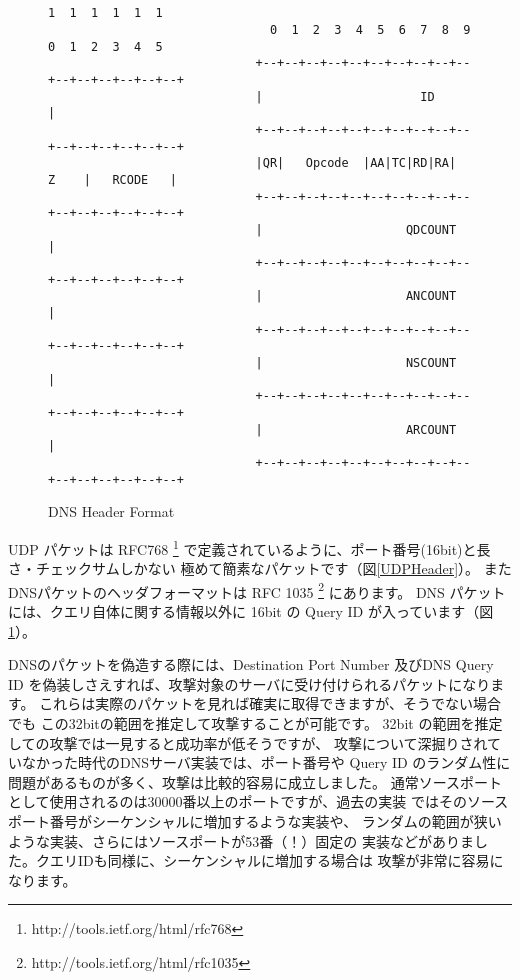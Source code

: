 \begin{figure}[hbt]
{\scriptsize
\begin{verbatim}

                                                             1  1  1  1  1  1
                               0  1  2  3  4  5  6  7  8  9  0  1  2  3  4  5
                             +--+--+--+--+--+--+--+--+--+--+--+--+--+--+--+--+
                             |                      ID                       |
                             +--+--+--+--+--+--+--+--+--+--+--+--+--+--+--+--+
                             |QR|   Opcode  |AA|TC|RD|RA|   Z    |   RCODE   |
                             +--+--+--+--+--+--+--+--+--+--+--+--+--+--+--+--+
                             |                    QDCOUNT                    |
                             +--+--+--+--+--+--+--+--+--+--+--+--+--+--+--+--+
                             |                    ANCOUNT                    |
                             +--+--+--+--+--+--+--+--+--+--+--+--+--+--+--+--+
                             |                    NSCOUNT                    |
                             +--+--+--+--+--+--+--+--+--+--+--+--+--+--+--+--+
                             |                    ARCOUNT                    |
                             +--+--+--+--+--+--+--+--+--+--+--+--+--+--+--+--+
\end{verbatim}
}
\caption{DNS Header Format}
\label{DNSHeader}
\end{figure}


UDP パケットは RFC768 \footnote{http://tools.ietf.org/html/rfc768}
で定義されているように、ポート番号(16bit)と長さ・チェックサムしかない
極めて簡素なパケットです（図\ref{UDPHeader}）。
またDNSパケットのヘッダフォーマットは RFC 1035 \footnote{http://tools.ietf.org/html/rfc1035} 
にあります。
DNS パケットには、クエリ自体に関する情報以外に 16bit の Query ID が入っています（図\ref{DNSHeader}）。

DNSのパケットを偽造する際には、Destination Port Number 及びDNS Query
ID を偽装しさえすれば、攻撃対象のサーバに受け付けられるパケットになります。
これらは実際のパケットを見れば確実に取得できますが、そうでない場合でも
この32bitの範囲を推定して攻撃することが可能です。
32bit の範囲を推定しての攻撃では一見すると成功率が低そうですが、
攻撃について深掘りされていなかった時代のDNSサーバ実装では、ポート番号や
Query ID のランダム性に問題があるものが多く、攻撃は比較的容易に成立しました。
通常ソースポートとして使用されるのは30000番以上のポートですが、過去の実装
ではそのソースポート番号がシーケンシャルに増加するような実装や、
ランダムの範囲が狭いような実装、さらにはソースポートが53番（！）固定の
実装などがありました。クエリIDも同様に、シーケンシャルに増加する場合は
攻撃が非常に容易になります。

